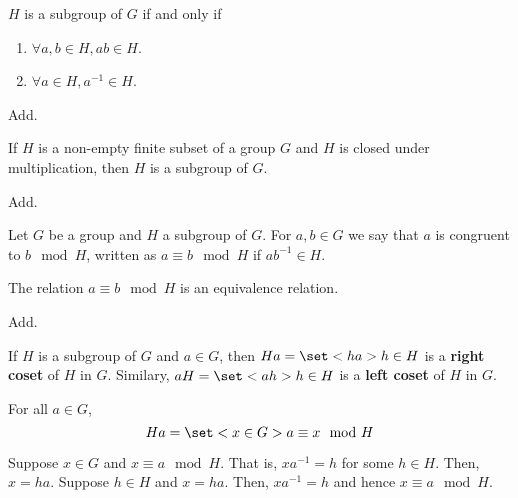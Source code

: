 \begin{lemma}
    \(H\) is a subgroup of \(G\) if and only if 
    \begin{enumerate}
        \item \(\forall a,b \in H, ab \in H\).
        \item \(\forall a \in H, a^{-1} \in H\).
    \end{enumerate}
\end{lemma}

\begin{prooflemma}
  Add.  
\end{prooflemma}

\begin{lemma}
    If \(H\) is a non-empty finite subset of a group \(G\) and \(H\) is closed under multiplication, then \(H\) is a subgroup of \(G\).
\end{lemma}

\begin{prooflemma}
    Add.
\end{prooflemma}

\begin{definition}
    Let \(G\) be a group and \(H\) a subgroup of \(G\). For \(a,b \in G\) we say that \(a\) is congruent to \(b \mod{H}\), written as \(a \equiv b \mod{H}\) if \(ab^{-1} \in H\).
\end{definition}

\begin{lemma}
    The relation \(a \equiv b \mod{H}\) is an equivalence relation.
\end{lemma}

\begin{prooflemma}
    Add.
\end{prooflemma}

\begin{definition}
    If \(H\) is a subgroup of \(G\) and \(a \in G\), then \(Ha = \set<ha>{h \in H}\) is a \textbf{right coset} of \(H\) in \(G\). Similary, \(aH = \set<ah>{h \in H}\) is a \textbf{left coset} of \(H\) in \(G\).
\end{definition}

\begin{lemma}
    For all \(a \in G\), 
    \begin{equation*}
        Ha = \set<x \in G>{a \equiv x \mod{H}}
    \end{equation*}
\end{lemma}

\begin{prooflemma}
    Suppose \(x \in G\) and \(x \equiv a \mod{H}\). That is, \(xa^{-1} = h\) for some \(h \in H\). Then, \(x = ha\). Suppose \(h \in H\) and \(x = ha\). Then, \(xa^{-1} = h\) and hence \(x \equiv a \mod{H}\).
\end{prooflemma}

